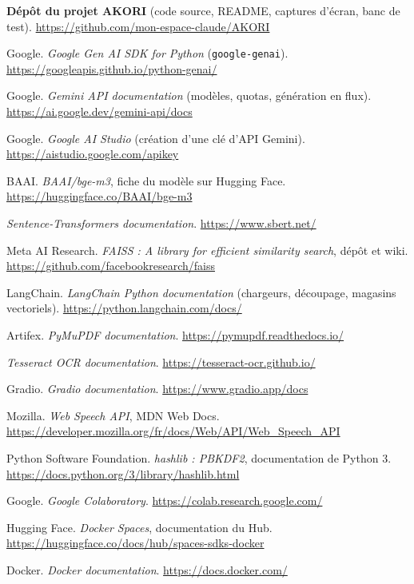 \documentclass[12pt,a4paper,oneside]{report}
\begin{document}
\begin{enumerate}[label={[W\arabic*]},ref={W\arabic*},leftmargin=3.2em,itemsep=0.35em]
  \item\label{web:depot} \textbf{Dépôt du projet AKORI} (code source, README, captures d'écran, banc de test). \url{https://github.com/mon-espace-claude/AKORI}
  \item\label{web:genaisdk} Google. \textit{Google Gen AI SDK for Python} (\texttt{google-genai}). \url{https://googleapis.github.io/python-genai/}
  \item\label{web:geminidoc} Google. \textit{Gemini API documentation} (modèles, quotas, génération en flux). \url{https://ai.google.dev/gemini-api/docs}
  \item\label{web:aistudio} Google. \textit{Google AI Studio} (création d'une clé d'API Gemini). \url{https://aistudio.google.com/apikey}
  \item\label{web:bgem3} BAAI. \textit{BAAI/bge-m3}, fiche du modèle sur Hugging Face. \url{https://huggingface.co/BAAI/bge-m3}
  \item\label{web:sbert} \textit{Sentence-Transformers documentation}. \url{https://www.sbert.net/}
  \item\label{web:faiss} Meta AI Research. \textit{FAISS : A library for efficient similarity search}, dépôt et wiki. \url{https://github.com/facebookresearch/faiss}
  \item\label{web:langchain} LangChain. \textit{LangChain Python documentation} (chargeurs, découpage, magasins vectoriels). \url{https://python.langchain.com/docs/}
  \item\label{web:pymupdf} Artifex. \textit{PyMuPDF documentation}. \url{https://pymupdf.readthedocs.io/}
  \item\label{web:tesseract} \textit{Tesseract OCR documentation}. \url{https://tesseract-ocr.github.io/}
  \item\label{web:gradio} Gradio. \textit{Gradio documentation}. \url{https://www.gradio.app/docs}
  \item\label{web:webspeech} Mozilla. \textit{Web Speech API}, MDN Web Docs. \url{https://developer.mozilla.org/fr/docs/Web/API/Web_Speech_API}
  \item\label{web:hashlib} Python Software Foundation. \textit{hashlib : PBKDF2}, documentation de Python 3. \url{https://docs.python.org/3/library/hashlib.html}
  \item\label{web:colab} Google. \textit{Google Colaboratory}. \url{https://colab.research.google.com/}
  \item\label{web:hfspaces} Hugging Face. \textit{Docker Spaces}, documentation du Hub. \url{https://huggingface.co/docs/hub/spaces-sdks-docker}
  \item\label{web:docker} Docker. \textit{Docker documentation}. \url{https://docs.docker.com/}
\end{enumerate}
\end{document}
